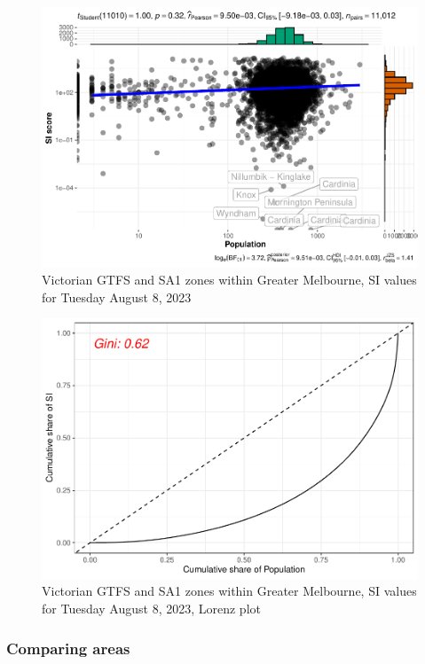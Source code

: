 \documentclass[preprint, 3p,
authoryear]{elsarticle} %
\begin{document}
\begin{figure}
\centering
\includegraphics{Leveraging_GTFS_to_assess_transit_supply_Transport_Geography_files/figure-latex/gghistostats-1.pdf}
\caption{Victorian GTFS and SA1 zones within Greater Melbourne, SI
values for Tuesday August 8, 2023}
\end{figure}

\begin{figure}
\centering
\includegraphics{Leveraging_GTFS_to_assess_transit_supply_Transport_Geography_files/figure-latex/Gini_coefficients-1.pdf}
\caption{Victorian GTFS and SA1 zones within Greater Melbourne, SI
values for Tuesday August 8, 2023, Lorenz plot}
\end{figure}

\hypertarget{comparing-areas}{%
\subsubsection{Comparing areas}\label{comparing-areas}}
\end{document}
